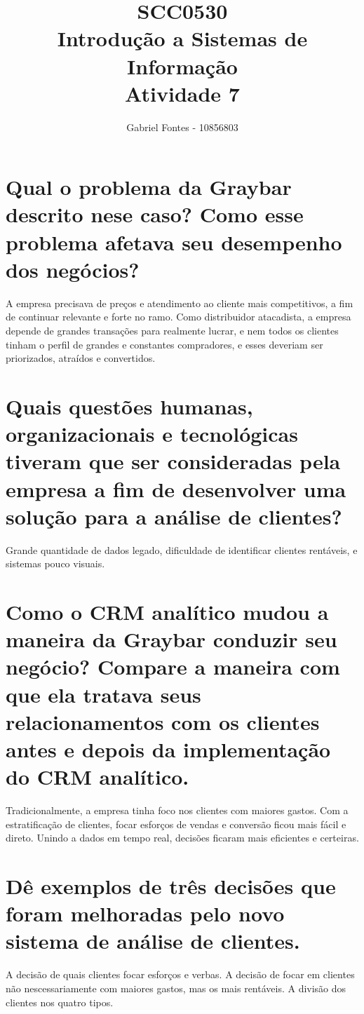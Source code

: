 \documentclass[12pt]{article}
\title{SCC0530 \\Introdução a Sistemas de Informação \\ Atividade 7}
\author{Gabriel Fontes - 10856803}
\begin{document}
\maketitle
\section{Qual o problema da Graybar descrito nese caso? Como esse problema afetava seu desempenho dos negócios?}
A empresa precisava de preços e atendimento ao cliente mais competitivos, a fim de continuar relevante e forte no ramo. Como distribuidor atacadista, a empresa depende de grandes transações para realmente lucrar, e nem todos os clientes tinham o perfil de grandes e constantes compradores, e esses deveriam ser priorizados, atraídos e convertidos.
\section{Quais questões humanas, organizacionais e tecnológicas tiveram que ser consideradas pela empresa a fim de desenvolver uma solução para a análise de clientes?}
Grande quantidade de dados legado, dificuldade de identificar clientes rentáveis, e sistemas pouco visuais.
\section{Como o CRM analítico mudou a maneira da Graybar conduzir seu negócio? Compare a maneira com que ela tratava seus relacionamentos com os clientes antes e depois da implementação do CRM analítico.}
Tradicionalmente, a empresa tinha foco nos clientes com maiores gastos. Com a estratificação de clientes, focar esforços de vendas e conversão ficou mais fácil e direto. Unindo a dados em tempo real, decisões ficaram mais eficientes e certeiras.
\section{Dê exemplos de três decisões que foram melhoradas pelo novo sistema de análise de clientes.}
A decisão de quais clientes focar esforços e verbas. A decisão de focar em clientes não nescessariamente com maiores gastos, mas os mais rentáveis. A divisão dos clientes nos quatro tipos.
\end{document}
